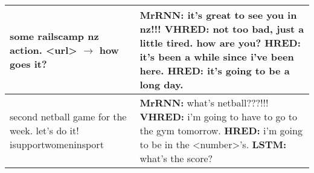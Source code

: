 \documentclass{article}
\begin{document}
\begin{table}[ht]
\begin{tabular}{p{45mm}|p{80mm}}
     some railscamp nz action. <url> $\rightarrow$ how goes it? & \textbf{MrRNN:} it's great to see you in nz!!!  \newline \textbf{VHRED:} not too bad, just a little tired. how are you? \newline \textbf{HRED:} it's been a while since i've been here. \newline \textbf{HRED:} it's going to be a long day.  \\ \hline 
     second netball game for the week. let's do it! isupportwomeninsport & \textbf{MrRNN:} what's netball???!!!  \newline \textbf{VHRED:} i'm going to have to go to the gym tomorrow. \newline \textbf{HRED:} i'm going to be in the <number>'s. \newline \textbf{LSTM:} what's the score? \\ \hline
 \end{tabular}
\end{table}


 
\end{document}
